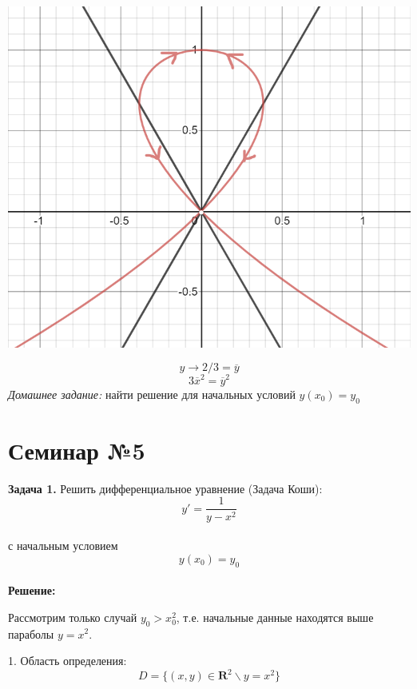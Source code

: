 \documentclass[10pt]{report}
\begin{document}
\begin{center}
{\includegraphics[scale=0.48]{graph4.1.png}} 
\end{center}
\[ y \rightarrow2/3 = \overline{y}\]
\[ 3\overline{x}^2 = \overline{y}^2\]
\textit{Домашнее задание:} найти решение для начальных условий $y(x_0) = y_0$\\

\chapter[{Семинар №5}]{Семинар №5}
\thispagestyle{empty}

\textbf{Задача 1.} Решить дифференциальное уравнение (Задача Коши): 
\newline
\begin{equation}
y' = \frac 1 {y-x^2}
\end{equation}\\
с начальным условием
\begin{equation}
y(x_0)=y_0
\end{equation}\\
\textbf{Решение:} \par

Рассмотрим только случай $y_0>x_0^2$, т.е. начальные данные находятся выше параболы $y=x^2$.

1. Область определения:\\
\[D = \{(x,y)\in \textbf{R} ^2 \backslash y = x^2\}\]
\end{document}
